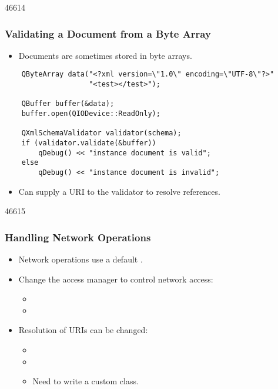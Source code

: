 \begin{slide}[fragile]{46614}
\frametitle{Validating a Document from a Byte Array}

\begin{itemize}
\item Documents are sometimes stored in byte arrays.
\end{itemize}

\begin{lstlisting}
    QByteArray data("<?xml version=\"1.0\" encoding=\"UTF-8\"?>"
                    "<test></test>");

    QBuffer buffer(&data);
    buffer.open(QIODevice::ReadOnly);

    QXmlSchemaValidator validator(schema);
    if (validator.validate(&buffer))
        qDebug() << "instance document is valid";
    else
        qDebug() << "instance document is invalid";
\end{lstlisting}

\begin{itemize}
\item Can supply a URI to the validator to resolve references.
\end{itemize}

\end{slide}

\begin{slide}[fragile]{46615}
\frametitle{Handling Network Operations}

\begin{itemize}
\item Network operations use a default .
\item Change the access manager to control network access:
\begin{itemize}
\item {}
\item {}
\end{itemize}
\item Resolution of URIs can be changed:
\begin{itemize}
\item {}
\item {}
\item Need to write a custom  class.
\end{itemize}
\end{itemize}

\end{slide}

